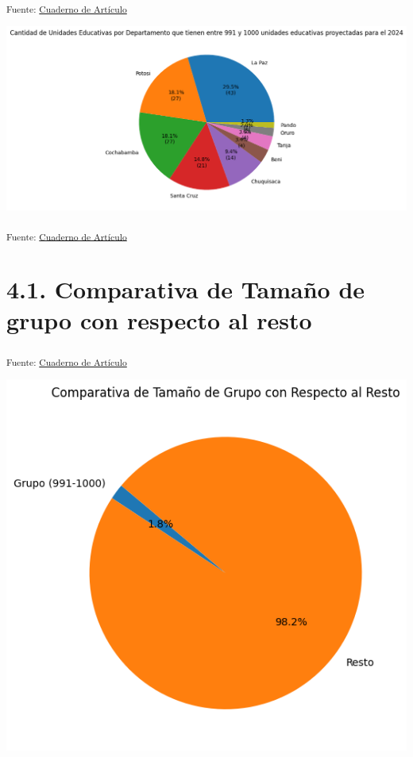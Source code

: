 \documentclass[
  12pt]{article}
\begin{document}
\textsubscript{Fuente: \href{sociest.org/index.ipynb.html}{Cuaderno de
Artículo}}

\includegraphics{index_files/figure-pdf/cell-20-output-1.png}

\textsubscript{Fuente: \href{sociest.org/index.ipynb.html}{Cuaderno de
Artículo}}

\section{4.1. Comparativa de Tamaño de grupo con respecto al
resto}\label{comparativa-de-tamauxf1o-de-grupo-con-respecto-al-resto}

\textsubscript{Fuente: \href{sociest.org/index.ipynb.html}{Cuaderno de
Artículo}}

\includegraphics{index_files/figure-pdf/cell-21-output-1.png}
\end{document}
